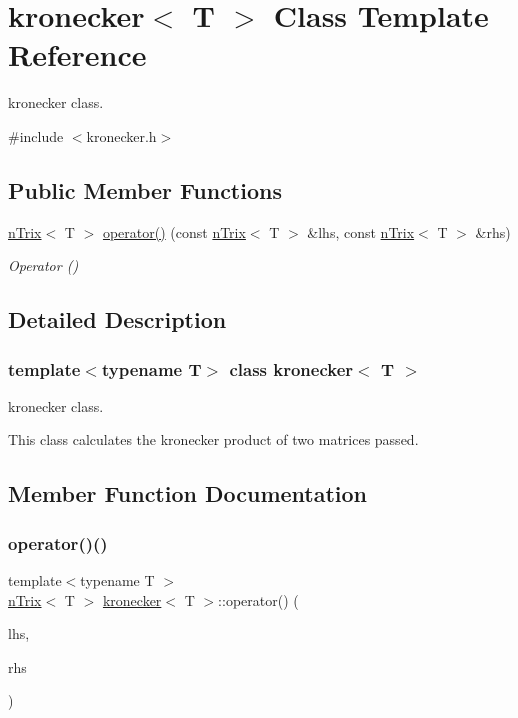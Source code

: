 \hypertarget{classkronecker}{}\section{kronecker$<$ T $>$ Class Template Reference}
\label{classkronecker}


kronecker class.  




{\ttfamily \#include $<$kronecker.\+h$>$}

\subsection*{Public Member Functions}
\begin{DoxyCompactItemize}
\item 
\hyperlink{classnTrix}{n\+Trix}$<$ T $>$ \hyperlink{classkronecker_a735e19d2af6975db2b19f801152d3bc9}{operator()} (const \hyperlink{classnTrix}{n\+Trix}$<$ T $>$ \&lhs, const \hyperlink{classnTrix}{n\+Trix}$<$ T $>$ \&rhs)
\begin{DoxyCompactList}\small\item\em Operator () \end{DoxyCompactList}\end{DoxyCompactItemize}


\subsection{Detailed Description}
\subsubsection*{template$<$typename T$>$\newline
class kronecker$<$ T $>$}

kronecker class. 

This class calculates the kronecker product of two matrices passed. 

\subsection{Member Function Documentation}
\mbox{\label{classkronecker_a735e19d2af6975db2b19f801152d3bc9}} 
\subsubsection{\texorpdfstring{operator()()}{operator()()}}
{\footnotesize\ttfamily template$<$typename T $>$ \\
\hyperlink{classnTrix}{n\+Trix}$<$ T $>$ \hyperlink{classkronecker}{kronecker}$<$ T $>$\+::operator() (\begin{DoxyParamCaption}\item[{const \hyperlink{classnTrix}{n\+Trix}$<$ T $>$ \&}]{lhs,  }\item[{const \hyperlink{classnTrix}{n\+Trix}$<$ T $>$ \&}]{rhs }\end{DoxyParamCaption})}



